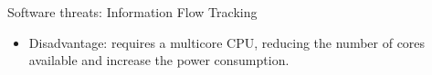 \begin{frame}{Software threats: Information Flow Tracking}
\begin{minipage}[c]{0.55\textwidth}
{            \begin{alertblock}{}
                \begin{itemize}
                    [square]
                    \justifying
                    \item Disadvantage: requires a multicore CPU, reducing the number of cores available and increase the power consumption.
                \end{itemize}
            \end{alertblock}
        }
\end{minipage}
\end{frame}
